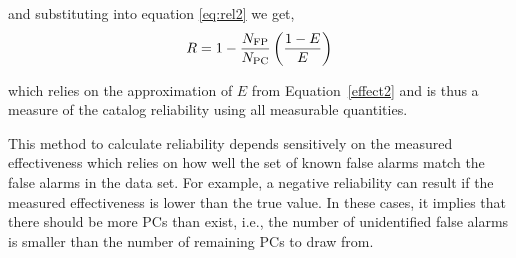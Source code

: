 \noindent and substituting into equation \ref{eq:rel2} we get,
\textbf{
\begin{equation}
R= 1 - \frac{N_{\rm FP}}{N_{\rm PC}}\left(\frac{1-E}{E}\right)
\end{equation}
}

\noindent which relies on the approximation of $E$ from Equation~\ref{effect2} and is thus a measure of the catalog reliability using all measurable quantities.




This method to calculate reliability depends sensitively on the measured effectiveness which relies on how well the set of known false alarms match the false alarms in the \opstce{} data set. For example, a negative reliability can result if the measured effectiveness is lower than the true value. In these cases, it implies that there should be more PCs than exist, i.e., the number of unidentified false alarms is smaller than the number of remaining PCs to draw from.  



